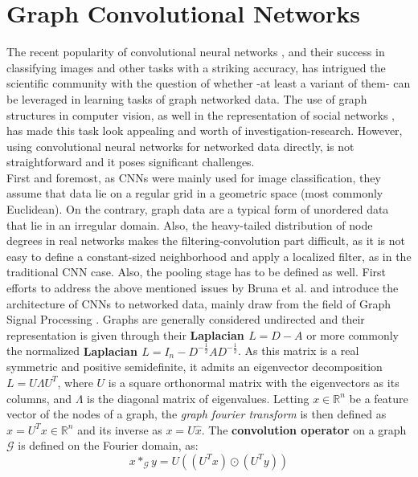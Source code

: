 \section{Graph Convolutional Networks}

The recent popularity of convolutional neural networks \cite{40k}, and their
success in classifying images and other tasks with a striking accuracy, has intrigued the scientific
community with the question of whether -at least a variant of them- can be leveraged in learning tasks
of graph networked data. The use of graph structures in computer
vision\cite{survey}, as well in the representation of social networks
\cite{kleinberg_book}, has made this task look appealing and worth of investigation-research.
However, using convolutional neural networks for
networked data directly, is not straightforward and it poses significant
challenges.\\
 First and foremost,
as CNNs were mainly used for image classification, they assume that
data lie on a regular grid in a geometric space (most commonly
Euclidean). On the contrary, graph data are a typical form of unordered data that lie in
an irregular domain. Also, the heavy-tailed distribution of node degrees
in real networks \cite{smth} makes the filtering-convolution part difficult,
as it is not easy to define a constant-sized neighborhood and apply a
localized filter, as in the traditional CNN case. Also, the pooling stage has to
be defined as well.
 First efforts to address the above mentioned issues
by Bruna et al. \cite{Lecun} and introduce the architecture of CNNs to networked data,
mainly draw from the field of Graph Signal Processing \cite{shuman}.
Graphs are generally considered undirected and their representation is given
through their \textbf{Laplacian $L = D -A$} or more commonly the normalized
\textbf{Laplacian $L = I_n - D^{-\frac{1}{2}}AD^{-\frac{1}{2}}$}. As this matrix
is a real symmetric and positive semidefinite, it admits an eigenvector
decomposition $L=U\Lambda U^T$, where $U$ is a square orthonormal matrix with
the eigenvectors as its columns, and $\Lambda$ is the diagonal matrix of eigenvalues.
Letting $x\in \mathbb{R}^{n}$ be a feature vector of the nodes of a graph,
the {\em graph fourier transform} is then defined as $\hat{x}=U^T x \in \mathbb{R}^n$
and its inverse as $x = U\hat{x}$. The \textbf{convolution operator} on a graph
$\mathcal{G}$ is defined on the Fourier domain, as:
\begin{equation*}
x *_{\mathcal{G}} y = U((U^T x)\odot (U^T y))
\end{equation*}
